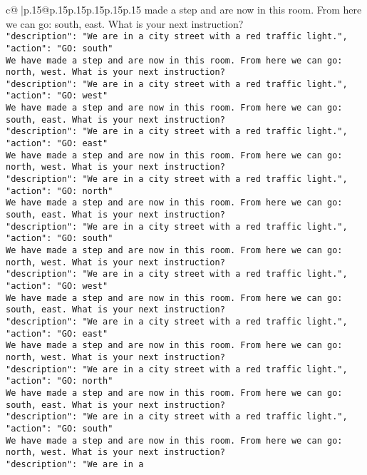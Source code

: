 \documentclass{article}
\begin{document}
{\begin{supertabular}{c@{$\;$}|p{.15\linewidth}@{}p{.15\linewidth}p{.15\linewidth}p{.15\linewidth}p{.15\linewidth}p{.15\linewidth}}
{{{made a step and are now in this room. From here we can go: south, east. What is your next instruction?\\ \tt {"description": "We are in a city street with a red traffic light.", "action": "GO: south"}\\ \tt We have made a step and are now in this room. From here we can go: north, west. What is your next instruction?\\ \tt {"description": "We are in a city street with a red traffic light.", "action": "GO: west"}\\ \tt We have made a step and are now in this room. From here we can go: south, east. What is your next instruction?\\ \tt {"description": "We are in a city street with a red traffic light.", "action": "GO: east"}\\ \tt We have made a step and are now in this room. From here we can go: north, west. What is your next instruction?\\ \tt {"description": "We are in a city street with a red traffic light.", "action": "GO: north"}\\ \tt We have made a step and are now in this room. From here we can go: south, east. What is your next instruction?\\ \tt {"description": "We are in a city street with a red traffic light.", "action": "GO: south"}\\ \tt We have made a step and are now in this room. From here we can go: north, west. What is your next instruction?\\ \tt {"description": "We are in a city street with a red traffic light.", "action": "GO: west"}\\ \tt We have made a step and are now in this room. From here we can go: south, east. What is your next instruction?\\ \tt {"description": "We are in a city street with a red traffic light.", "action": "GO: east"}\\ \tt We have made a step and are now in this room. From here we can go: north, west. What is your next instruction?\\ \tt {"description": "We are in a city street with a red traffic light.", "action": "GO: north"}\\ \tt We have made a step and are now in this room. From here we can go: south, east. What is your next instruction?\\ \tt {"description": "We are in a city street with a red traffic light.", "action": "GO: south"}\\ \tt We have made a step and are now in this room. From here we can go: north, west. What is your next instruction?\\ \tt {"description": "We are in a 
	  } 
	   } 
	   } 
	  \\ 
 

}
\end{supertabular}}
\end{document}
